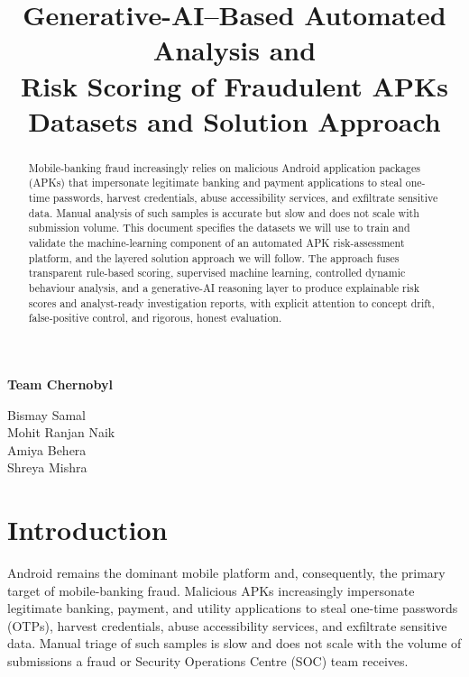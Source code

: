\documentclass[11pt,a4paper]{article}
\title{\vspace{-1.5em}\textbf{Generative-AI--Based Automated Analysis and\\
Risk Scoring of Fraudulent APKs}\\[0.4em]
\large Datasets and Solution Approach}
\author{}
\date{}
\begin{document}
\maketitle
\vspace{-2em}

\begin{center}
{\Large \textbf{Team Chernobyl}}

\vspace{0.8em}

{\large
Bismay Samal \\
Mohit Ranjan Naik \\
Amiya Behera \\
Shreya Mishra
}
\end{center}

\vspace{2em}

\begin{abstract}
\noindent
Mobile-banking fraud increasingly relies on malicious Android application packages
(APKs) that impersonate legitimate banking and payment applications to steal one-time
passwords, harvest credentials, abuse accessibility services, and exfiltrate sensitive
data. Manual analysis of such samples is accurate but slow and does not scale with
submission volume. This document specifies the datasets we will use to train and
validate the machine-learning component of an automated APK risk-assessment platform,
and the layered solution approach we will follow. The approach fuses transparent
rule-based scoring, supervised machine learning, controlled dynamic behaviour analysis,
and a generative-AI reasoning layer to produce explainable risk scores and
analyst-ready investigation reports, with explicit attention to concept drift,
false-positive control, and rigorous, honest evaluation.
\end{abstract}

\vspace{1em}


\section{Introduction}
Android remains the dominant mobile platform and, consequently, the primary target of
mobile-banking fraud. Malicious APKs increasingly impersonate legitimate banking,
payment, and utility applications to steal one-time passwords (OTPs), harvest
credentials, abuse accessibility services, and exfiltrate sensitive data. Manual triage
of such samples is slow and does not scale with the volume of submissions a fraud or
Security Operations Centre (SOC) team receives.
\end{document}
